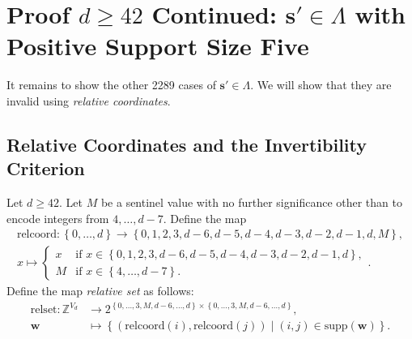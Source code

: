 \section{Proof \( d \geq 42\) Continued: \( \mathbf{s}' \in \Lambda\) with Positive Support Size Five}

It remains to show the other 2289 cases of \( \mathbf{s}' \in \Lambda \). We will show that they are invalid using \emph{relative coordinates}.

\subsection{Relative Coordinates and the Invertibility Criterion}

\begin{definition}
    Let \( d \geq 42 \).
    Let \( M \) be a sentinel value with no further significance other than to encode integers from \( 4, \dots, d-7 \). Define the map 
    \begin{align*}
        \mathrm{relcoord}: \left\{ 0, \dots, d \right\} \to \left\{ 0,1,2,3,d-6,d-5,d-4,d-3,d-2,d-1,d,M \right\}, \\
        x \mapsto \begin{cases}
            x & \text{if } x \in \left\{ 0,1,2,3, d-6,d-5,d-4,d-3,d-2,d-1,d \right\}, \\
            M& \text{if } x \in \left\{ 4, \dots, d-7 \right\}.
        \end{cases}.
    \end{align*}
    Define the map \emph{relative set} as follows:
    \begin{align*}
        \mathrm{relset}: \mathbb{Z}^{V_d} &\to 2^{\left\{ 0, \dots, 3, M, d-6, \dots, d \right\} \times \left\{ 0, \dots, 3, M, d-6, \dots, d \right\}}, \\
        \mathbf{w} &\mapsto \left\{ (\mathrm{relcoord}(i), \mathrm{relcoord}(j)) \mid (i,j) \in \mathrm{supp}(\mathbf{w}) \right\}.
    \end{align*}
\end{definition}

